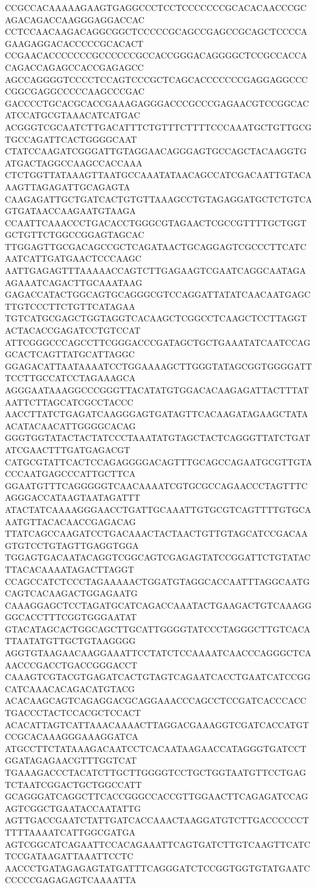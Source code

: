 CCGCCACAAAAAGAAGTGAGGCCCTCCTCCCCCCCGCACACAACCCGCAGACAGACCAAGGGAGGACCAC
CCTCCAACAAGACAGGCGGCTCCCCCGCAGCCGAGCCGCAGCTCCCCAGAAGAGGACACCCCCGCACACT
CCGAACACCCCCCCGCCCCCCGCCACCGGGACAGGGGCTCCGCCACCACAGACCAGAGCCACCGAGAGCC
AGCCAGGGGTCCCCTCCAGTCCCGCTCAGCACCCCCCCGAGGAGGCCCCGGCGAGGCCCCCAAGCCCGAC
GACCCCTGCACGCACCGAAAGAGGGACCCGCCCGAGAACGTCCGGCACATCCATGCGTAAACATCATGAC
ACGGGTCGCAATCTTGACATTTCTGTTTCTTTTCCCAAATGCTGTTGCGTGCCAGATTCACTGGGGCAAT
CTATCCAAGATCGGGATTGTAGGAACAGGGAGTGCCAGCTACAAGGTGATGACTAGGCCAAGCCACCAAA
CTCTGGTTATAAAGTTAATGCCAAATATAACAGCCATCGACAATTGTACAAAGTTAGAGATTGCAGAGTA
CAAGAGATTGCTGATCACTGTGTTAAAGCCTGTAGAGGATGCTCTGTCAGTGATAACCAAGAATGTAAGA
CCAATTCAAACCCTGACACCTGGGCGTAGAACTCGCCGTTTTGCTGGTGCTGTTCTGGCCGGAGTAGCAC
TTGGAGTTGCGACAGCCGCTCAGATAACTGCAGGAGTCGCCCTTCATCAATCATTGATGAACTCCCAAGC
AATTGAGAGTTTAAAAACCAGTCTTGAGAAGTCGAATCAGGCAATAGAAGAAATCAGACTTGCAAATAAG
GAGACCATACTGGCAGTGCAGGGCGTCCAGGATTATATCAACAATGAGCTTGTCCCTTCTGTTCATAGAA
TGTCATGCGAGCTGGTAGGTCACAAGCTCGGCCTCAAGCTCCTTAGGTACTACACCGAGATCCTGTCCAT
ATTCGGGCCCAGCCTTCGGGACCCGATAGCTGCTGAAATATCAATCCAGGCACTCAGTTATGCATTAGGC
GGAGACATTAATAAAATCCTGGAAAAGCTTGGGTATAGCGGTGGGGATTTCCTTGCCATCCTAGAAAGCA
AGGGAATAAAGGCCCGGGTTACATATGTGGACACAAGAGATTACTTTATAATTCTTAGCATCGCCTACCC
AACCTTATCTGAGATCAAGGGAGTGATAGTTCACAAGATAGAAGCTATAACATACAACATTGGGGCACAG
GGGTGGTATACTACTATCCCTAAATATGTAGCTACTCAGGGTTATCTGATATCGAACTTTGATGAGACGT
CATGCGTATTCACTCCAGAGGGGACAGTTTGCAGCCAGAATGCGTTGTACCCAATGAGCCCATTGCTTCA
GGAATGTTTCAGGGGGTCAACAAAATCGTGCGCCAGAACCCTAGTTTCAGGGACCATAAGTAATAGATTT
ATACTATCAAAAGGGAACCTGATTGCAAATTGTGCGTCAGTTTTGTGCAAATGTTACACAACCGAGACAG
TTATCAGCCAAGATCCTGACAAACTACTAACTGTTGTAGCATCCGACAAGTGTCCTGTAGTTGAGGTGGA
TGGAGTGACAATACAGGTCGGCAGTCGAGAGTATCCGGATTCTGTATACTTACACAAAATAGACTTAGGT
CCAGCCATCTCCCTAGAAAAACTGGATGTAGGCACCAATTTAGGCAATGCAGTCACAAGACTGGAGAATG
CAAAGGAGCTCCTAGATGCATCAGACCAAATACTGAAGACTGTCAAAGGGGCACCTTTCGGTGGGAATAT
GTACATAGCACTGGCAGCTTGCATTGGGGTATCCCTAGGGCTTGTCACATTAATATGTTGCTGTAAGGGG
AGGTGTAAGAACAAGGAAATTCCTATCTCCAAAATCAACCCAGGGCTCAAACCCGACCTGACCGGGACCT
CAAAGTCGTACGTGAGATCACTGTAGTCAGAATCACCTGAATCATCCGGCATCAAACACAGACATGTACG
ACACAAGCAGTCAGAGGACGCAGGAAACCCAGCCTCCGATCACCCACCTGACCCTACTCCACGCTCCACT
ACACATTAGTCATTAAACAAAACTTAGGACGAAAGGTCGATCACCATGTCCGCACAAAGGGAAAGGATCA
ATGCCTTCTATAAAGACAATCCTCACAATAAGAACCATAGGGTGATCCTGGATAGAGAACGTTTGGTCAT
TGAAAGACCCTACATCTTGCTTGGGGTCCTGCTGGTAATGTTCCTGAGTCTAATCGGACTGCTGGCCATT
GCAGGGATCAGGCTTCACCGGGCCACCGTTGGAACTTCAGAGATCCAGAGTCGGCTGAATACCAATATTG
AGTTGACCGAATCTATTGATCACCAAACTAAGGATGTCTTGACCCCCCTTTTTAAAATCATTGGCGATGA
AGTCGGCATCAGAATTCCACAGAAATTCAGTGATCTTGTCAAGTTCATCTCCGATAAGATTAAATTCCTC
AACCCTGATAGAGAGTATGATTTCAGGGATCTCCGGTGGTGTATGAATCCCCCCGAGAGAGTCAAAATTA
